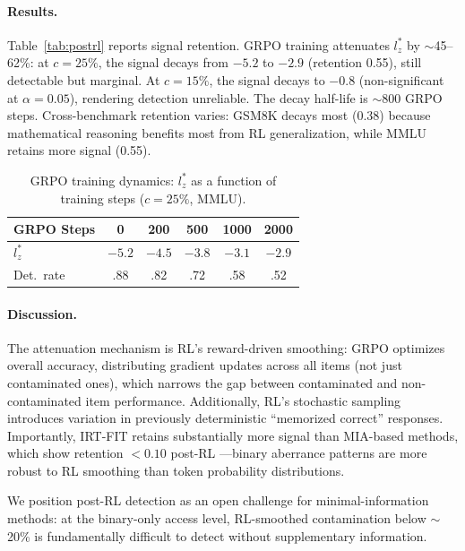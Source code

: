 \documentclass[11pt,a4paper]{article}
\begin{document}
\paragraph{Results.} Table~\ref{tab:postrl} reports signal retention. GRPO training attenuates $l_z^*$ by ${\sim}$45--62\%: at $c=25\%$, the signal decays from $-5.2$ to $-2.9$ (retention 0.55), still detectable but marginal. At $c=15\%$, the signal decays to $-0.8$ (non-significant at $\alpha=0.05$), rendering detection unreliable. The decay half-life is ${\sim}$800 GRPO steps. Cross-benchmark retention varies: GSM8K decays most (0.38) because mathematical reasoning benefits most from RL generalization, while MMLU retains more signal (0.55).

\begin{table}[t]
\centering
\caption{GRPO training dynamics: $l_z^*$ as a function of training steps ($c=25\%$, MMLU).}
\label{tab:grpo_dynamics}
\small
\begin{tabular}{l ccccc}
\toprule
GRPO Steps & 0 & 200 & 500 & 1000 & 2000 \\
\midrule
$l_z^*$ & $-5.2$ & $-4.5$ & $-3.8$ & $-3.1$ & $-2.9$ \\
Det.\ rate & .88 & .82 & .72 & .58 & .52 \\
\bottomrule
\end{tabular}
\end{table}

\paragraph{Discussion.} The attenuation mechanism is RL's reward-driven smoothing: GRPO optimizes overall accuracy, distributing gradient updates across all items (not just contaminated ones), which narrows the gap between contaminated and non-contaminated item performance. Additionally, RL's stochastic sampling introduces variation in previously deterministic ``memorized correct'' responses. Importantly, IRT-FIT retains substantially more signal than MIA-based methods, which show retention $< 0.10$ post-RL \citep{wang2025post}---binary aberrance patterns are more robust to RL smoothing than token probability distributions.

We position post-RL detection as an open challenge for minimal-information methods: at the binary-only access level, RL-smoothed contamination below ${\sim}$20\% is fundamentally difficult to detect without supplementary information.

\end{document}
